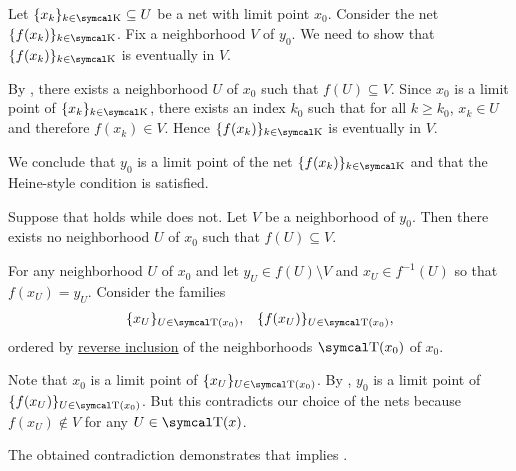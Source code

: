 \begin{RefListProof}
     Let \( \{ x_k \}_{k \in \CK} \subseteq U \) be a net  with limit point \( x_0 \). Consider the net \( \{ f(x_k) \}_{k \in \CK} \). Fix a neighborhood \( V \) of \( y_0 \). We need to show that \( \{ f(x_k) \}_{k \in \CK} \) is eventually in \( V \).

    By , there exists a neighborhood \( U \) of \( x_0 \) such that \( f(U) \subseteq V \). Since \( x_0 \) is a limit point of \( \{ x_k \}_{k \in \CK} \), there exists an index \( k_0 \) such that for all \( k \geq k_0 \), \( x_k \in U \) and therefore \( f(x_k) \in V \). Hence \( \{ f(x_k) \}_{k \in \CK} \) is eventually in \( V \).

    We conclude that \( y_0 \) is a limit point of the net \( \{ f(x_k) \}_{k \in \CK} \) and that the Heine-style condition is satisfied.

     Suppose that  holds while  does not\LEM. Let \( V \) be a neighborhood of \( y_0 \). Then there exists no neighborhood \( U \) of \( x_0 \) such that \( f(U) \subseteq V \).

    For any neighborhood \( U \) of \( x_0 \) and let \( y_U \in f(U) \setminus V \) and \( x_U \in f^{-1} (U) \) so that \( f(x_U) = y_U \). Consider the families
    \begin{align*}
      \{ x_U \}_{U \in \CT(x_0)},
      &&
      \{ f(x_U) \}_{U \in \CT(x_0)},
    \end{align*}
    ordered by \hyperref[ex:reverse_inclusion_net]{reverse inclusion} of the neighborhoods \( \CT(x_0) \) of \( x_0 \).

    Note that \( x_0 \) is a limit point of \( \{ x_U \}_{U \in \CT(x_0)} \). By , \( y_0 \) is a limit point of \( \{ f(x_U) \}_{U \in \CT(x_0)} \). But this contradicts our choice of the nets because \( f(x_U) \not\in V \) for any \( U \in \CT(x) \).

    The obtained contradiction demonstrates that  implies .
\end{RefListProof}

